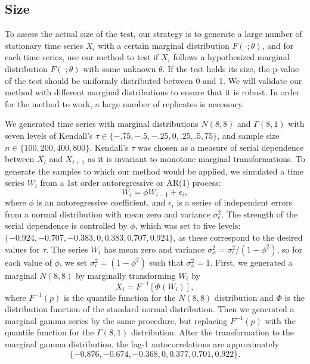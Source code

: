 \documentclass[12pt]{article}
\begin{document}
\subsection{Size}
To assess the actual size of the test, our strategy is to
generate a large number of stationary time series $X_i$ with a certain marginal
distribution $F(\cdot; \theta)$, and for each time series, use our method to
test if $X_i$ follows a hypothesized marginal distribution $F(\cdot; \theta)$
with some unknown $\theta$. If the test holds its size, the p-value
of the test should be uniformly distributed between 0 and 1. We will validate
our method with different marginal distributions to ensure that it is robust.
In order for the method to work, a large number of replicates is necessary.


We generated time series with marginal distributions $N(8, 8)$ and
$\Gamma(8, 1)$ with seven levels of Kendall's
$\tau \in \{-.75, -.5, -.25, 0, .25, .5, 75\}$, and
sample size $n \in \{100, 200, 400, 800\}$. Kendall's $\tau$ was chosen as a
measure of serial dependence between $X_i$ and
$X_{i+1}$ as it is invariant to monotone marginal
transformations.
To generate the samples to which our
method would be applied, we simulated a time series $W_i$ from a 1st
order autoregressive or AR(1) process:
\begin{equation*}
W_i = \phi W_{i-1} + \epsilon_i,
\end{equation*}
where $\phi$ is an autoregressive coefficient, and $\epsilon_i$ is a series of
independent errors from a normal distribution with mean zero and variance
$\sigma_{\epsilon}^2$. The strength of the serial dependence is controlled by
$\phi$, which was set to five levels:
$\{-0.924, -0.707, -0.383, 0, 0.383, 0.707, 0.924\}$, as these
correspond to the desired values for $\tau$. The
series $W_i$ has mean zero and variance
$\sigma_x^2 = \sigma_{\epsilon}^2 / (1 - \phi^2)$, so for each value of
$\phi$,  we
set $\sigma_{\epsilon}^2 = (1 - \phi^2)$ such that $\sigma_x^2 = 1$.
First, we generated a
marginal $N(8, 8)$ by marginally transforming $W_i$ by
\begin{equation*}
X_i = F^{-1}[\Phi(W_i)],
\end{equation*}
where $F^{-1}(p)$ is the quantile function for the $N(8, 8)$
distribution and $\Phi$ is the distribution function of the standard normal
distribution.
Then we generated a marginal gamma series by the same procedure, but
replacing $F^{-1}(p)$ with the quantile function for the $\Gamma(8, 1)$
distribution. After the transformation
to the marginal gamma distribution, the lag-1 autocorrelations are approximately
\[
  \{-0.876, -0.674, -0.368, 0, 0.377, 0.701, 0.922\}.
\]
\end{document}
